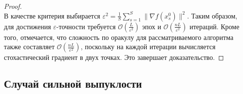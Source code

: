 \begin{theorem}
\begin{proof}
\begin{equation*}
        \end{equation*}    
В качестве критерия выбирается \(\varepsilon^2 = \frac{1}{S}\sum\limits_{s=1}^{S} \|\nabla f(x_s^0)\|^2\). Таким образом, для достижения \(\varepsilon\)-точности требуется \(\mathcal{O}\left(\frac{L}{\varepsilon^2}\right)\) эпох и \(\mathcal{O}\left(\frac{nL}{\varepsilon^2}\right)\) итераций. Кроме того, отмечается, что сложность по оракулу для рассматриваемого алгоритма также составляет \(\mathcal{O}\left(\frac{nL}{\varepsilon^2}\right)\), поскольку на каждой итерации вычисляется стохастический градиент в двух точках. Это завершает доказательство.
\end{proof}
\end{theorem}
\subsection{Случай сильной выпуклости}


